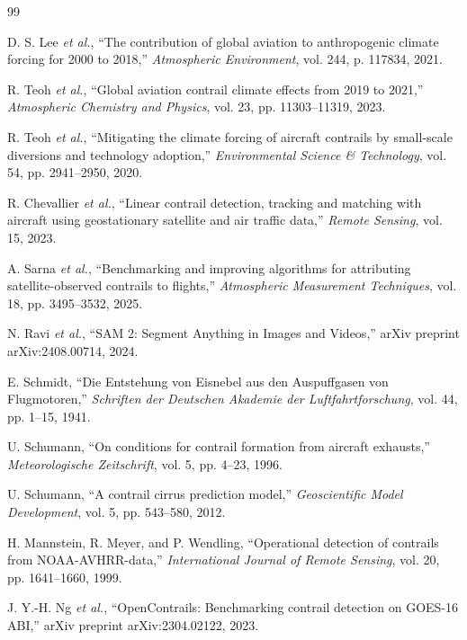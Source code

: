\documentclass[review]{elsarticle}
\begin{document}
\begin{thebibliography}{99}

D. S. Lee \textit{et al.}, ``The contribution of global aviation to anthropogenic climate forcing for 2000 to 2018,'' \textit{Atmospheric Environment}, vol. 244, p. 117834, 2021.

R. Teoh \textit{et al.}, ``Global aviation contrail climate effects from 2019 to 2021,'' \textit{Atmospheric Chemistry and Physics}, vol. 23, pp. 11303--11319, 2023.

R. Teoh \textit{et al.}, ``Mitigating the climate forcing of aircraft contrails by small-scale diversions and technology adoption,'' \textit{Environmental Science \& Technology}, vol. 54, pp. 2941--2950, 2020.

R. Chevallier \textit{et al.}, ``Linear contrail detection, tracking and matching with aircraft using geostationary satellite and air traffic data,'' \textit{Remote Sensing}, vol. 15, 2023.

A. Sarna \textit{et al.}, ``Benchmarking and improving algorithms for attributing satellite-observed contrails to flights,'' \textit{Atmospheric Measurement Techniques}, vol. 18, pp. 3495--3532, 2025.

N. Ravi \textit{et al.}, ``SAM 2: Segment Anything in Images and Videos,'' arXiv preprint arXiv:2408.00714, 2024.

E. Schmidt, ``Die Entstehung von Eisnebel aus den Auspuffgasen von Flugmotoren,'' \textit{Schriften der Deutschen Akademie der Luftfahrtforschung}, vol. 44, pp. 1--15, 1941.

U. Schumann, ``On conditions for contrail formation from aircraft exhausts,'' \textit{Meteorologische Zeitschrift}, vol. 5, pp. 4--23, 1996.

U. Schumann, ``A contrail cirrus prediction model,'' \textit{Geoscientific Model Development}, vol. 5, pp. 543--580, 2012.

H. Mannstein, R. Meyer, and P. Wendling, ``Operational detection of contrails from NOAA-AVHRR-data,'' \textit{International Journal of Remote Sensing}, vol. 20, pp. 1641--1660, 1999.

J. Y.-H. Ng \textit{et al.}, ``OpenContrails: Benchmarking contrail detection on GOES-16 ABI,'' arXiv preprint arXiv:2304.02122, 2023.


\end{thebibliography}
\end{document}
